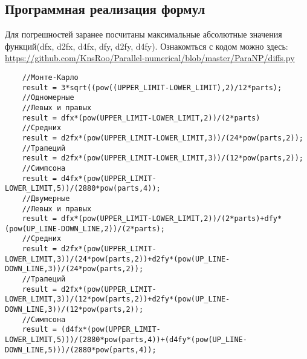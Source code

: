 \documentclass{article}
\begin{document}
\subsection{Программная реализация формул}
Для погрешностей заранее посчитаны максимальные абсолютные значения функций(dfx, d2fx, d4fx, dfy, d2fy, d4fy).
Ознакомться с кодом можно здесь:
\newline
\href{https://github.com/KnsRoo/Parallel-numerical/blob/master/ParaNP/diffs.py}{https://github.com/KnsRoo/Parallel-numerical/blob/master/ParaNP/diffs.py}
\begin{lstlisting}
    //Монте-Карло
    result = 3*sqrt((pow((UPPER_LIMIT-LOWER_LIMIT),2)/12*parts);
    //Одномерные
    //Левых и правых
    result = dfx*(pow(UPPER_LIMIT-LOWER_LIMIT,2))/(2*parts)
    //Средних
    result = d2fx*(pow(UPPER_LIMIT-LOWER_LIMIT,3))/(24*pow(parts,2));
    //Трапеций
    result = d2fx*(pow(UPPER_LIMIT-LOWER_LIMIT,3))/(12*pow(parts,2));
    //Симпсона
    result = d4fx*(pow(UPPER_LIMIT-LOWER_LIMIT,5))/(2880*pow(parts,4));
    //Двумерные
    //Левых и правых
    result = dfx*(pow(UPPER_LIMIT-LOWER_LIMIT,2))/(2*parts)+dfy*(pow(UP_LINE-DOWN_LINE,2))/(2*parts);
    //Средних
    result = d2fx*(pow(UPPER_LIMIT-LOWER_LIMIT,3))/(24*pow(parts,2))+d2fy*(pow(UP_LINE-DOWN_LINE,3))/(24*pow(parts,2));
    //Трапеций
    result = d2fx*(pow(UPPER_LIMIT-LOWER_LIMIT,3))/(12*pow(parts,2))+d2fy*(pow(UP_LINE-DOWN_LINE,3))/(12*pow(parts,2));
    //Симпсона
    result = (d4fx*(pow(UPPER_LIMIT-LOWER_LIMIT,5)))/(2880*pow(parts,4))+(d4fy*(pow(UP_LINE-DOWN_LINE,5)))/(2880*pow(parts,4));
\end{lstlisting}
\end{document}
